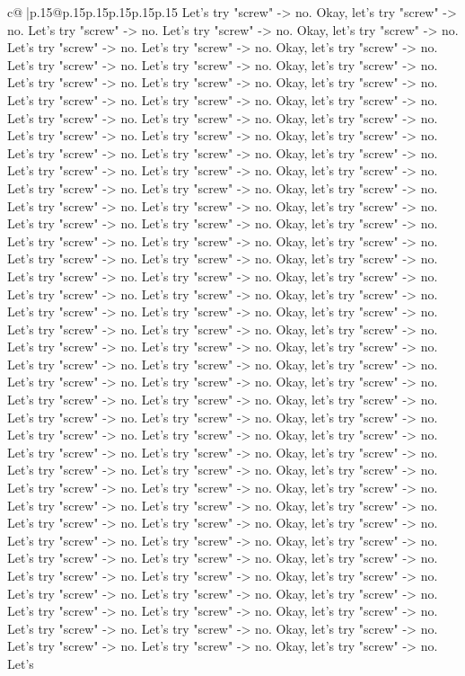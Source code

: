\documentclass{article}
\begin{document}
{\begin{supertabular}{c@{$\;$}|p{.15\linewidth}@{}p{.15\linewidth}p{.15\linewidth}p{.15\linewidth}p{.15\linewidth}p{.15\linewidth}}
{{{Let's try "screw" {-}> no. Okay, let's try "screw" {-}> no. Let's try "screw" {-}> no. Let's try "screw" {-}> no. Okay, let's try "screw" {-}> no. Let's try "screw" {-}> no. Let's try "screw" {-}> no. Okay, let's try "screw" {-}> no. Let's try "screw" {-}> no. Let's try "screw" {-}> no. Okay, let's try "screw" {-}> no. Let's try "screw" {-}> no. Let's try "screw" {-}> no. Okay, let's try "screw" {-}> no. Let's try "screw" {-}> no. Let's try "screw" {-}> no. Okay, let's try "screw" {-}> no. Let's try "screw" {-}> no. Let's try "screw" {-}> no. Okay, let's try "screw" {-}> no. Let's try "screw" {-}> no. Let's try "screw" {-}> no. Okay, let's try "screw" {-}> no. Let's try "screw" {-}> no. Let's try "screw" {-}> no. Okay, let's try "screw" {-}> no. Let's try "screw" {-}> no. Let's try "screw" {-}> no. Okay, let's try "screw" {-}> no. Let's try "screw" {-}> no. Let's try "screw" {-}> no. Okay, let's try "screw" {-}> no. Let's try "screw" {-}> no. Let's try "screw" {-}> no. Okay, let's try "screw" {-}> no. Let's try "screw" {-}> no. Let's try "screw" {-}> no. Okay, let's try "screw" {-}> no. Let's try "screw" {-}> no. Let's try "screw" {-}> no. Okay, let's try "screw" {-}> no. Let's try "screw" {-}> no. Let's try "screw" {-}> no. Okay, let's try "screw" {-}> no. Let's try "screw" {-}> no. Let's try "screw" {-}> no. Okay, let's try "screw" {-}> no. Let's try "screw" {-}> no. Let's try "screw" {-}> no. Okay, let's try "screw" {-}> no. Let's try "screw" {-}> no. Let's try "screw" {-}> no. Okay, let's try "screw" {-}> no. Let's try "screw" {-}> no. Let's try "screw" {-}> no. Okay, let's try "screw" {-}> no. Let's try "screw" {-}> no. Let's try "screw" {-}> no. Okay, let's try "screw" {-}> no. Let's try "screw" {-}> no. Let's try "screw" {-}> no. Okay, let's try "screw" {-}> no. Let's try "screw" {-}> no. Let's try "screw" {-}> no. Okay, let's try "screw" {-}> no. Let's try "screw" {-}> no. Let's try "screw" {-}> no. Okay, let's try "screw" {-}> no. Let's try "screw" {-}> no. Let's try "screw" {-}> no. Okay, let's try "screw" {-}> no. Let's try "screw" {-}> no. Let's try "screw" {-}> no. Okay, let's try "screw" {-}> no. Let's try "screw" {-}> no. Let's try "screw" {-}> no. Okay, let's try "screw" {-}> no. Let's try "screw" {-}> no. Let's try "screw" {-}> no. Okay, let's try "screw" {-}> no. Let's try "screw" {-}> no. Let's try "screw" {-}> no. Okay, let's try "screw" {-}> no. Let's try "screw" {-}> no. Let's try "screw" {-}> no. Okay, let's try "screw" {-}> no. Let's try "screw" {-}> no. Let's try "screw" {-}> no. Okay, let's try "screw" {-}> no. Let's try "screw" {-}> no. Let's try "screw" {-}> no. Okay, let's try "screw" {-}> no. Let's try "screw" {-}> no. Let's try "screw" {-}> no. Okay, let's try "screw" {-}> no. Let's try "screw" {-}> no. Let's try "screw" {-}> no. Okay, let's try "screw" {-}> no. Let's try "screw" {-}> no. Let's try "screw" {-}> no. Okay, let's try "screw" {-}> no. Let's try "screw" {-}> no. Let's try "screw" {-}> no. Okay, let's try "screw" {-}> no. Let's try "screw" {-}> no. Let's try "screw" {-}> no. Okay, let's try "screw" {-}> no. Let's try "screw" {-}> no. Let's try "screw" {-}> no. Okay, let's try "screw" {-}> no. Let's }}}
\end{supertabular}}
\end{document}

